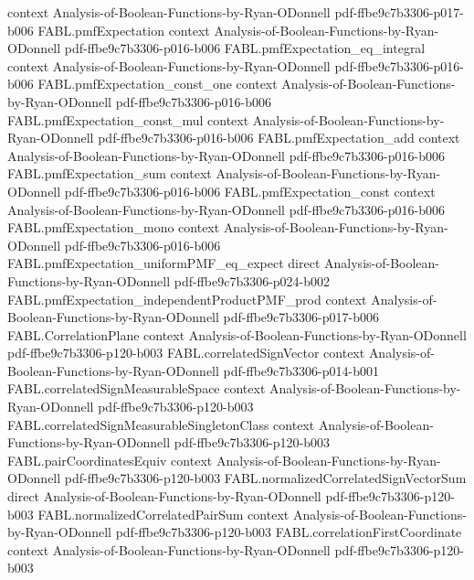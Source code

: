 \begin{theorem}
  {context}
  {Analysis-of-Boolean-Functions-by-Ryan-ODonnell}
  {pdf-ffbe9c7b3306-p017-b006}
\proofstep
  {FABL.pmfExpectation}
  {context}
  {Analysis-of-Boolean-Functions-by-Ryan-ODonnell}
  {pdf-ffbe9c7b3306-p016-b006}
\proofstep
  {FABL.pmfExpectation_eq_integral}
  {context}
  {Analysis-of-Boolean-Functions-by-Ryan-ODonnell}
  {pdf-ffbe9c7b3306-p016-b006}
\proofstep
  {FABL.pmfExpectation_const_one}
  {context}
  {Analysis-of-Boolean-Functions-by-Ryan-ODonnell}
  {pdf-ffbe9c7b3306-p016-b006}
\proofstep
  {FABL.pmfExpectation_const_mul}
  {context}
  {Analysis-of-Boolean-Functions-by-Ryan-ODonnell}
  {pdf-ffbe9c7b3306-p016-b006}
\proofstep
  {FABL.pmfExpectation_add}
  {context}
  {Analysis-of-Boolean-Functions-by-Ryan-ODonnell}
  {pdf-ffbe9c7b3306-p016-b006}
\proofstep
  {FABL.pmfExpectation_sum}
  {context}
  {Analysis-of-Boolean-Functions-by-Ryan-ODonnell}
  {pdf-ffbe9c7b3306-p016-b006}
\proofstep
  {FABL.pmfExpectation_const}
  {context}
  {Analysis-of-Boolean-Functions-by-Ryan-ODonnell}
  {pdf-ffbe9c7b3306-p016-b006}
\proofstep
  {FABL.pmfExpectation_mono}
  {context}
  {Analysis-of-Boolean-Functions-by-Ryan-ODonnell}
  {pdf-ffbe9c7b3306-p016-b006}
\proofstep
  {FABL.pmfExpectation_uniformPMF_eq_expect}
  {direct}
  {Analysis-of-Boolean-Functions-by-Ryan-ODonnell}
  {pdf-ffbe9c7b3306-p024-b002}
\proofstep
  {FABL.pmfExpectation_independentProductPMF_prod}
  {context}
  {Analysis-of-Boolean-Functions-by-Ryan-ODonnell}
  {pdf-ffbe9c7b3306-p017-b006}
\proofstep
  {FABL.CorrelationPlane}
  {context}
  {Analysis-of-Boolean-Functions-by-Ryan-ODonnell}
  {pdf-ffbe9c7b3306-p120-b003}
\proofstep
  {FABL.correlatedSignVector}
  {context}
  {Analysis-of-Boolean-Functions-by-Ryan-ODonnell}
  {pdf-ffbe9c7b3306-p014-b001}
\proofstep
  {FABL.correlatedSignMeasurableSpace}
  {context}
  {Analysis-of-Boolean-Functions-by-Ryan-ODonnell}
  {pdf-ffbe9c7b3306-p120-b003}
\proofstep
  {FABL.correlatedSignMeasurableSingletonClass}
  {context}
  {Analysis-of-Boolean-Functions-by-Ryan-ODonnell}
  {pdf-ffbe9c7b3306-p120-b003}
\proofstep
  {FABL.pairCoordinatesEquiv}
  {context}
  {Analysis-of-Boolean-Functions-by-Ryan-ODonnell}
  {pdf-ffbe9c7b3306-p120-b003}
\proofstep
  {FABL.normalizedCorrelatedSignVectorSum}
  {direct}
  {Analysis-of-Boolean-Functions-by-Ryan-ODonnell}
  {pdf-ffbe9c7b3306-p120-b003}
\proofstep
  {FABL.normalizedCorrelatedPairSum}
  {context}
  {Analysis-of-Boolean-Functions-by-Ryan-ODonnell}
  {pdf-ffbe9c7b3306-p120-b003}
\proofstep
  {FABL.correlationFirstCoordinate}
  {context}
  {Analysis-of-Boolean-Functions-by-Ryan-ODonnell}
  {pdf-ffbe9c7b3306-p120-b003}

\end{theorem}
